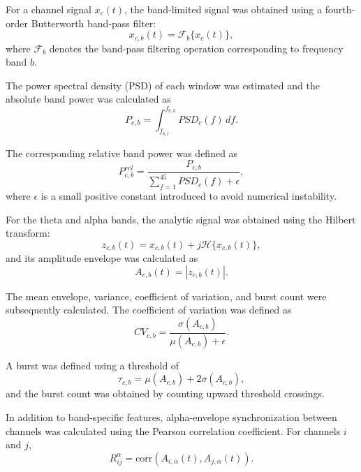 \documentclass[conference]{IEEEtran}
\begin{document}
For a channel signal $x_c(t)$, the band-limited signal was obtained using a fourth-order Butterworth band-pass filter:
\begin{equation}
x_{c,b}(t)=
\mathcal{F}_{b}\{x_c(t)\},
\end{equation}
where $\mathcal{F}_{b}$ denotes the band-pass filtering operation corresponding to frequency band $b$.

The power spectral density (PSD) of each window was estimated and the absolute band power was calculated as
\begin{equation}
P_{c,b} =
\int_{f_{b,l}}^{f_{b,h}}
PSD_c(f)\,df.
\end{equation}

The corresponding relative band power was defined as
\begin{equation}
P^{rel}_{c,b}
=
\frac{P_{c,b}}
{\displaystyle\sum_{f=1}^{45}PSD_c(f)+\epsilon},
\end{equation}
where $\epsilon$ is a small positive constant introduced to avoid numerical instability.

For the theta and alpha bands, the analytic signal was obtained using the Hilbert transform:
\begin{equation}
z_{c,b}(t)
=
x_{c,b}(t)+j\mathcal{H}\{x_{c,b}(t)\},
\end{equation}
and its amplitude envelope was calculated as
\begin{equation}
A_{c,b}(t)=|z_{c,b}(t)|.
\end{equation}

The mean envelope, variance, coefficient of variation, and burst count were subsequently calculated. The coefficient of variation was defined as
\begin{equation}
CV_{c,b}
=
\frac{\sigma(A_{c,b})}
{\mu(A_{c,b})+\epsilon}.
\end{equation}

A burst was defined using a threshold of
\begin{equation}
\tau_{c,b}
=
\mu(A_{c,b})+2\sigma(A_{c,b}),
\end{equation}
and the burst count was obtained by counting upward threshold crossings.

In addition to band-specific features, alpha-envelope synchronization between channels was calculated using the Pearson correlation coefficient. For channels $i$ and $j$,
\begin{equation}
R_{ij}^{\alpha}
=
\mathrm{corr}
\left(A_{i,\alpha}(t),A_{j,\alpha}(t)\right).
\end{equation}
\end{document}
